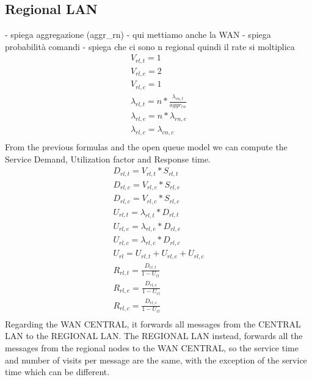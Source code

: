 \documentclass[11pt]{article}
\begin{document}
\subsection{Regional LAN}
- spiega aggregazione (aggr\_rn)
- qui mettiamo anche la WAN
- spiega probabilità comandi
- spiega che ci sono n regional quindi il rate si moltiplica
\begin{equation}
	\begin{array}{l}
		V_{rl, t} = 1 \\
		V_{rl, e} = 2 \\ %
		V_{rl,c} = 1 \\
		\lambda_{rl, t} = n*\frac{\lambda_{rn, t}}{aggr_{rn}} \\
		\lambda_{rl, e} = n*\lambda_{rn, e} \\
		\lambda_{rl, c} = \lambda_{cn, c} \\
	\end{array}
\end{equation}
From the previous formulas and the open queue model we can compute the Service Demand, Utilization factor and Response time.
\begin{equation}
	\begin{array}{l}
		D_{rl, t} = V_{rl, t} * S_{rl, t} \\
		D_{rl, e} = V_{rl, e} * S_{rl, e} \\
		D_{rl, c} = V_{rl, c} * S_{rl, c} \\
		U_{rl, t} = \lambda_{rl, t} * D_{rl, t} \\
		U_{rl, e} = \lambda_{rl, e} * D_{rl, e} \\
		U_{rl, c} = \lambda_{rl, c} * D_{rl, c} \\
		U_{rl} = U_{rl, t} + U_{rl, e} + U_{rl, c} \\
		R_{rl, t} = \frac{D_{rl, t}}{1 - U_{rl}} \\
		R_{rl, e} = \frac{D_{rl, e}}{1 - U_{rl}} \\
		R_{rl, c} = \frac{D_{rl, c}}{1 - U_{rl}} \\
	\end{array}
\end{equation}
Regarding the WAN CENTRAL, it forwards all messages from the CENTRAL LAN to the REGIONAL LAN. The REGIONAL LAN instead, forwards all the messages from the regional nodes to the WAN CENTRAL, so the service time and number of visits per message are the same, with the exception of the service time which can be different.
\end{document}

